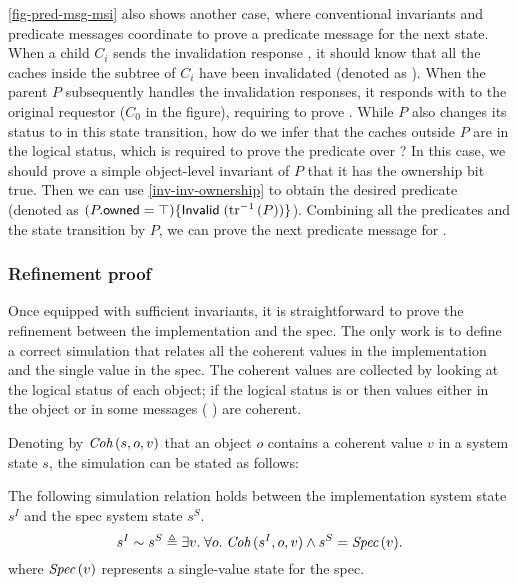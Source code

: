 \autoref{fig-pred-msg-msi} also shows another case, where conventional invariants and predicate messages coordinate to prove a predicate message for the next state.
When a child $C_i$ sends the invalidation response , it should know that all the caches inside the subtree of $C_i$ have been invalidated (denoted as {\color{myblue} }).
When the parent $P$ subsequently handles the invalidation responses, it responds with  to the original requestor ($C_0$ in the figure), requiring to prove {\color{myred} }.
While $P$ also changes its status to \stI{} in this state transition, how do we infer that the caches outside $P$ are in the logical \stI{} status, which is required to prove the predicate over {\color{myred} }?
In this case, we should prove a simple object-level invariant of $P$ that it has the ownership bit true.
Then we can use \autoref{inv-inv-ownership} to obtain the desired predicate (denoted as {\color{myblue} $(P.\textsf{owned} = \top)\{\textsf{Invalid}\;(\textrm{tr}^{-1}\,(P))\}$}).
Combining all the predicates and the state transition by $P$, we can prove the next predicate message for {\color{myred} }.

\subsubsection{Refinement proof}

Once equipped with sufficient invariants, it is straightforward to prove the refinement between the implementation and the spec.
The only work is to define a correct simulation that relates all the coherent values in the implementation and the single value in the spec.
The coherent values are collected by looking at the logical status of each object; if the logical status is \stS{} or \stM{} then values either in the object or in some messages (\eg{} ) are coherent.

Denoting by $\textit{Coh}\,(s, o, v)$ that an object $o$ contains a coherent value $v$ in a system state $s$, the simulation can be stated as follows:
\begin{theorem}
  \label{thm-msi-correct}
  The following simulation relation holds between the implementation system state $s^I$ and the spec system state $s^S$.
  \begin{displaymath}
    s^I \sim s^S \triangleq \exists v.\; \forall o.\; \textit{Coh}\,(s^I, o, v) \wedge s^S = \textit{Spec}\,(v).
  \end{displaymath}
  where $\textit{Spec}\,(v)$ represents a single-value state for the spec.
\end{theorem}

